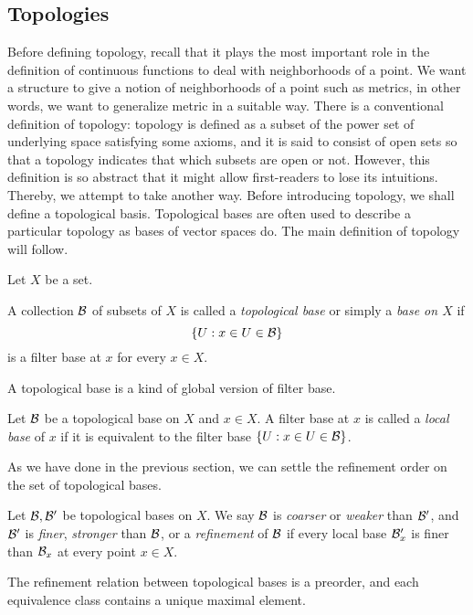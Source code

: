 \documentclass{../crs}
\begin{document}
\subsection{Topologies}
Before defining topology, recall that it plays the most important role in the definition of continuous functions to deal with neighborhoods of a point.
We want a structure to give a notion of neighborhoods of a point such as metrics, in other words, we want to generalize metric in a suitable way.
There is a conventional definition of topology: topology is defined as a subset of the power set of underlying space satisfying some axioms, and it is said to consist of open sets so that a topology indicates that which subsets are open or not.
However, this definition is so abstract that it might allow first-readers to lose its intuitions.
Thereby, we attempt to take another way.
Before introducing topology, we shall define a topological basis.
Topological bases are often used to describe a particular topology as bases of vector spaces do.
The main definition of topology will follow.

Let $X$ be a set.
\begin{defn}
A collection $\mathcal{B}$ of subsets of $X$ is called a \emph{topological base} or simply a \emph{base on $X$} if
\[\{U:x\in U\in\mathcal{B}\}\]
is a filter base at $x$ for every $x\in X$.
\end{defn}

A topological base is a kind of global version of filter base.

\begin{defn}
Let $\mathcal{B}$ be a topological base on $X$ and $x\in X$.
A filter base at $x$ is called a \emph{local base} of $x$ if it is equivalent to the filter base $\{U:x\in U\in\mathcal{B}\}$.
\end{defn}

As we have done in the previous section, we can settle the refinement order on the set of topological bases.

\begin{defn}
Let $\mathcal{B},\mathcal{B}'$ be topological bases on $X$.
We say $\mathcal{B}$ is \emph{coarser} or \emph{weaker} than $\mathcal{B}'$, and $\mathcal{B}'$ is \emph{finer}, \emph{stronger} than $\mathcal{B}$, or a \emph{refinement} of $\mathcal{B}$ if every local base $\mathcal{B}'_x$ is finer than $\mathcal{B}_x$ at every point $x\in X$.
\end{defn}
\begin{prop}
The refinement relation between topological bases is a preorder, and each equivalence class contains a unique maximal element.
\end{prop}
\begin{pf}

\end{pf}
\end{document}
